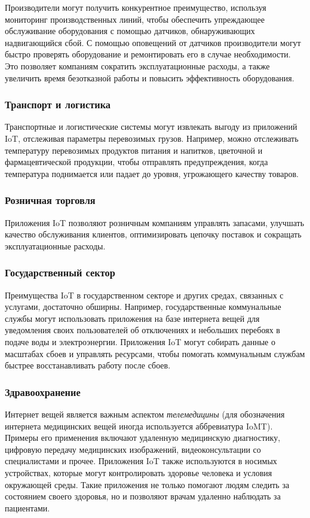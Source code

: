 Производители могут получить конкурентное преимущество, используя мониторинг производственных линий, чтобы обеспечить упреждающее обслуживание оборудования с помощью датчиков, обнаруживающих надвигающийся сбой. С помощью оповещений от датчиков производители могут быстро проверять оборудование и ремонтировать его в случае необходимости. Это позволяет компаниям сократить эксплуатационные расходы, а также увеличить время безотказной работы и повысить эффективность оборудования.

\subsubsection{Транспорт и логистика}

Транспортные и логистические системы могут извлекать выгоду из приложений IoT, отслеживая параметры перевозимых грузов. Например, можно отслеживать температуру перевозимых продуктов питания и напитков, цветочной и фармацевтической продукции, чтобы отправлять предупреждения, когда температура поднимается или падает до уровня, угрожающего качеству товаров.
	
\subsubsection{Розничная торговля}

Приложения IoT позволяют розничным компаниям управлять запасами, улучшать качество обслуживания клиентов, оптимизировать цепочку поставок и сокращать эксплуатационные расходы.

\subsubsection{Государственный сектор}

Преимущества IoT в государственном секторе и других средах, связанных с услугами, достаточно обширны. Например, государственные коммунальные службы могут использовать приложения на базе интернета вещей для уведомления своих пользователей об отключениях и небольших перебоях в подаче воды и электроэнергии. Приложения IoT могут собирать данные о масштабах сбоев и управлять ресурсами, чтобы помогать коммунальным службам быстрее восстанавливать работу после сбоев.

\subsubsection{Здравоохранение}

Интернет вещей является важным аспектом \textit{телемедицины} \cite{Kaspersky} (для обозначения интернета медицинских вещей иногда используется аббревиатура IoMT). Примеры его применения включают удаленную медицинскую диагностику, цифровую передачу медицинских изображений, видеоконсультации со специалистами и прочее. Приложения IoT также используются в носимых устройствах, которые могут контролировать здоровье человека и условия окружающей среды. Такие приложения не только помогают людям следить за состоянием своего здоровья, но и позволяют врачам удаленно наблюдать за пациентами.

